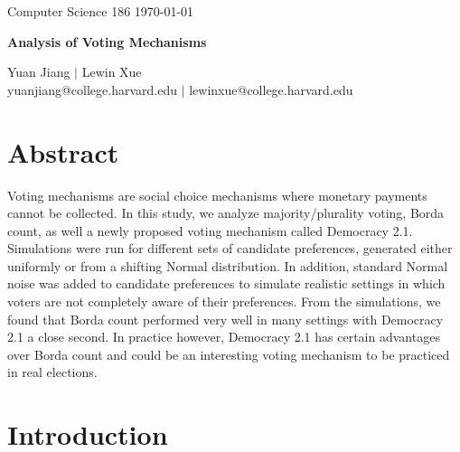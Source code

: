 \documentclass[11pt]{scrartcl}
\begin{document}


\noindent Computer Science 186 \hfill \today\\
\noindent\makebox[\linewidth]{\rule{6.5in}{2.0pt}}

\begin{center}


{{\LARGE \bf Analysis of Voting Mechanisms}}

\noindent\makebox[\linewidth]{\rule{6.5in}{2.0pt}}

\vspace{3mm}

{\large Yuan Jiang $|$ Lewin Xue} \\
\normalsize yuanjiang@college.harvard.edu $|$ lewinxue@college.harvard.edu \\

\end{center}


\vspace{2mm}

\section{Abstract}
Voting mechanisms are social choice mechanisms where monetary payments cannot be collected. In this study, we analyze majority/plurality voting, Borda count, as well a newly proposed voting mechanism called Democracy 2.1. Simulations were run for different sets of candidate preferences, generated either uniformly or from a shifting Normal distribution. In addition, standard Normal noise was added to candidate preferences to simulate realistic settings in which voters are not completely aware of their preferences. From the simulations, we found that Borda count performed very well in many settings with Democracy 2.1 a close second. In practice however, Democracy 2.1 has certain advantages over Borda count and could be an interesting voting mechanism to be practiced in real elections. 

\section{Introduction}
\end{document}

